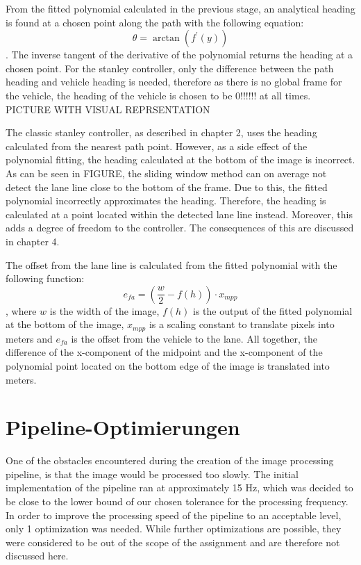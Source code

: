 \documentclass[arbeit=studie,oneside,BCOR=12mm]{ArbeitRST}
\begin{document}
From the fitted polynomial calculated in the previous stage, an analytical
heading is found at a chosen point along the path with the following equation:
$$\theta = \arctan(f^\prime(y))$$. The inverse tangent of the derivative of
the polynomial returns the heading at a chosen point. For the stanley
controller, only the difference between the path heading and vehicle heading
is needed, therefore as there is no global frame for the vehicle, the heading
of the vehicle is chosen to be 0!!!!!! at all times. PICTURE WITH VISUAL
REPRSENTATION 

The classic stanley controller, as described in chapter 2, uses the heading
calculated from the nearest path point. However, as a side effect of the
polynomial fitting, the heading calculated at the bottom of the image is
incorrect. As can be seen in FIGURE, the sliding window method can on average
not detect the lane line close to the bottom of the frame. Due to this, the
fitted polynomial incorrectly approximates the heading. Therefore, the heading
is calculated at a point located within the detected lane line instead.
Moreover, this adds a degree of freedom to the controller. The consequences of
this are discussed in chapter 4.


The offset from the lane line is calculated from the fitted polynomial with
the following function: $$e_{fa} = (\frac{w}{2} - f(h))\cdot x_{mpp}$$, where
$w$ is the width of the image, $f(h)$ is the output of the fitted polynomial
at the bottom of the image, $x_{mpp}$ is a scaling constant to translate
pixels into meters and $e_{fa}$ is the offset from the vehicle to the lane.
All together, the difference of the x-component of the midpoint and the
x-component of the polynomial point located on the bottom edge of the image is
translated into meters.
\section{Pipeline-Optimierungen}
One of the obstacles encountered during the creation of the image processing
pipeline, is that the image would be processed too slowly. 
The initial implementation of the pipeline ran at approximately 15 Hz, which was
decided to be close to the lower bound of our chosen tolerance for the 
processing frequency. 
In order to improve the processing speed of the pipeline to an acceptable level,
only 1 optimization was needed. 
While further optimizations are possible, they were considered to be out of the
scope of the assignment and are therefore not discussed here.
\end{document}
